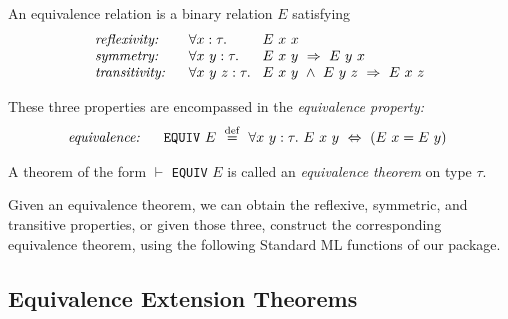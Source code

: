 \documentclass[envcountsame,runningheads]{llncs}
\def\defeq{\stackrel{\mathrm{def}}{=}}
\begin{document}
An equivalence relation is a binary relation $E$ satisfying
$$
\begin{array}{l@{\hspace{0.6cm}}l@{\hspace{0.3cm}}l}
\mbox{\it reflexivity:} &
\forall x:\tau . & E\ x\ x \\
\mbox{\it symmetry:} &
\forall x\ y :\tau. & E\ x\ y \ \Rightarrow \ E\ y\ x \\
\mbox{\it transitivity:} &
\forall x\ y\ z:\tau. & E\ x\ y \ \wedge \ E\ y\ z \ \Rightarrow \ E\ x\ z
\end{array}
$$

These three properties are encompassed in
the {\it equivalence property:}
$$
\begin{array}[t]{l@{\hspace{0.6cm}}l@{\hspace{0.3cm}}}
\mbox{\it equivalence:} &
\mbox{\tt EQUIV}\ E \ \defeq \
\forall x\ y :\tau.\ E\ x\ y \ \Leftrightarrow \ (E\ x = E\ y)
\end{array}
$$

\noindent
A theorem of the form
$\vdash$ {\tt EQUIV} $E$
is called an {\it equivalence theorem\/} on type $\tau$.

Given an equivalence theorem, we can obtain the reflexive, symmetric,
and transitive properties, or given those three, construct the corresponding
equivalence theorem, using the following Standard ML functions of our package.
\begin{center}
\end{center}

%
\subsection{Equivalence Extension Theorems}
%
\label{condequivs}
\end{document}
